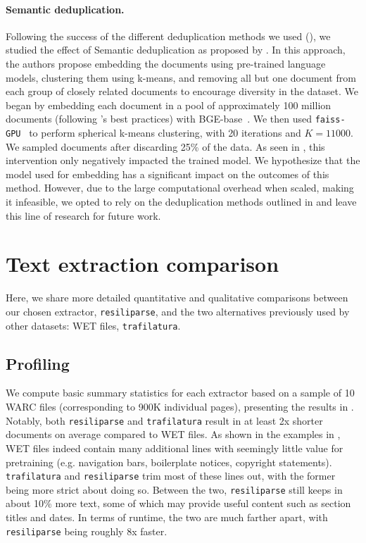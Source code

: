 \documentclass{article}
\newcommand{\trafilatura}{\texttt{trafilatura}\xspace}
\newcommand{\resiliparse}{\texttt{resiliparse}\xspace}
\begin{document}
\paragraph{Semantic deduplication.} Following the success of the different deduplication methods we used (), we studied the effect of Semantic deduplication as proposed by \citet{abbas2023semdedup}.
In this approach, the authors propose embedding the documents using pre-trained language models, clustering them using k-means, and removing all but one document from each group of closely related documents to encourage diversity in the dataset.
We began by embedding each document in a pool of approximately 100 million documents (following \citet{abbas2023semdedup}'s best practices) with BGE-base~\citep{bge_embedding}.
We then used \texttt{faiss-GPU}~\citep{johnson2019billion} to perform spherical k-means clustering, with 20 iterations and $K=11000$.
We sampled documents after discarding 25\% of the data.
As seen in , this intervention only negatively impacted the trained model.
We hypothesize that the model used for embedding has a significant impact on the outcomes of this method.
However, due to the large computational overhead when scaled, making it infeasible, we opted to rely on the deduplication methods outlined in  and leave this line of research for future work.



\section{Text extraction comparison}\label{appx:text-extraction}

Here, we share more detailed quantitative and qualitative comparisons between our chosen extractor, \resiliparse \citep{resiliparse1}, and the two alternatives previously used by other datasets: WET files, \trafilatura \citep{trafilatura}.

\subsection{Profiling}

We compute basic summary statistics for each extractor based on a sample of 10 WARC files (corresponding to 900K individual pages), presenting the results in . Notably, both \resiliparse and \trafilatura result in at least 2x shorter documents on average compared to WET files.  As shown in the examples in , WET files indeed contain many additional lines with seemingly little value for pretraining (e.g. navigation bars, boilerplate notices, copyright statements). \trafilatura and \resiliparse trim most of these lines out, with the former being more strict about doing so. Between the two, \resiliparse still keeps in about 10\% more text, some of which may provide useful content such as section titles and dates. In terms of runtime, the two are much farther apart, with \resiliparse being roughly 8x faster.
\end{document}
